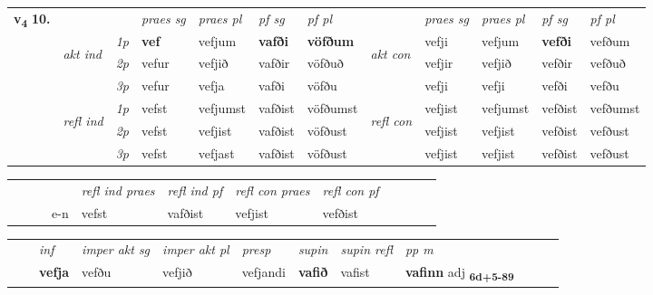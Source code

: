 \begin{tabular}{llllllllllll} \toprule
\multirow{4}{*}{{{\textbf{v{\textsubscript{4}}} \Large{\textbf{10.}}}}}  & &   &  \textit{praes sg}  & \textit{praes pl}  &\textit{ pf sg} & \textit{pf pl} &  &  \textit{praes sg}  & \textit{praes pl}  & \textit{pf sg} & \textit{pf pl } \\*
	\cmidrule{4-7} \cmidrule{9-12}
 & \multirow{3}{*}{\begin{turn}{90}\textit{akt ind}\end{turn}} & {\textit{1p}} & \textbf{vef} & vefjum    & \textbf{vafði} & \textbf{vöfðum} & \multirow{3}{*}{\begin{turn}{90}\textit{akt con}\end{turn}} &vefji & vefjum & \textbf{vefði} & vefðum\\*
& &  {\textit{2p}} &  vefur  & vefjið   & vafðir & vöfðuð & & vefjir & vefjið & vefðir & vefðuð \\*
& &  {\textit{3p}} & vefur & vefja   & vafði & vöfðu & & vefji & vefji& vefði & vefðu  \\*
\cmidrule{4-7} \cmidrule{9-12}
 &\multirow{3}{*}{\begin{turn}{90}\textit{refl ind}\end{turn}} & {\textit{1p}} & vefst & vefjumst    & vafðist & vöfðumst & \multirow{3}{*}{\begin{turn}{90}\textit{refl con}\end{turn}}  &vefjist & vefjumst & vefðist & vefðumst\\*
 &&  {\textit{2p}} &  vefst  & vefjist   & vafðist & vöfðust & &vefjist & vefjist & vefðist & vefðust \\*
& &  {\textit{3p}} & vefst & vefjast   & vafðist & vöfðust & & vefjist & vefjist& vefðist & vefðust  \\*
\cmidrule{4-7} \cmidrule{9-12}
\end{tabular}


\begin{tabular}{llllllllllll}
 & &  & &  \textit{refl ind praes} & \textit{refl ind pf} & \textit{refl con praes} & \textit{refl con pf} \\*
&  & & e-n & vefst & vafðist & vefjist & vefðist \\*
\cmidrule{5-9}
\end{tabular}


\begin{tabular}{llllllllllll}
 & & \textit{inf} & \textit{imper akt sg} & \textit{imper akt pl}   & \textit{presp} & \textit{supin} & \textit{supin refl} & \textit{pp m}     \\*
  & & \textbf{vefja} & vefðu  & vefjið   & vefjandi &  \textbf{vafið} & vafist & \textbf{vafinn} adj \textbf{\textsubscript{6d+5-89}} \\*
\cmidrule{1-12}
\end{tabular}



